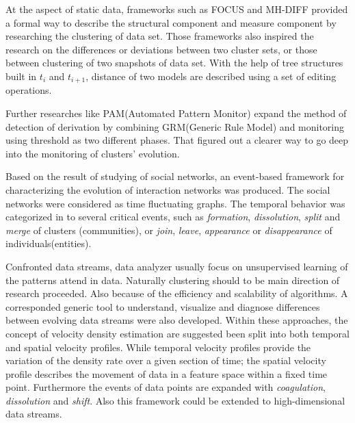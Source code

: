 \documentclass{sig-alternate-05-2015}
\begin{document}
At the aspect of static data, frameworks such as FOCUS\cite{GANTI:datachar} and MH-DIFF\cite{CHAWATHE:changedetection} provided a formal way to describe the structural component and measure component by researching the clustering of data set. Those frameworks also inspired the research on the differences or deviations between two cluster sets, or those between clustering of two snapshots of data set. With the help of tree structures built in $t_i$ and $t_{i+1}$, distance of two models are described using a set of editing operations.

Further researches like PAM(Automated Pattern Monitor)\cite{BARON:webusagepattern} expand the method of detection of derivation by combining GRM(Generic Rule Model) and monitoring using threshold as two different phases. That figured out a clearer way to go deep into the monitoring of clusters' evolution.

Based on the result of studying of social networks, an event-based framework\cite{FALKOWSKI:socialnet}\cite{ASUR:event} for characterizing the evolution of interaction networks was produced. The social networks were considered as time fluctuating graphs. The temporal behavior was categorized in to several critical events, such as \emph{formation}, \emph{dissolution}, \emph{split} and \emph{merge} of clusters (communities), or \emph{join}, \emph{leave}, \emph{appearance} or \emph{disappearance} of individuals(entities).

Confronted data streams, data analyzer usually focus on unsupervised learning of the patterns attend in data. Naturally clustering should to be main direction of research proceeded\cite{AGGARWAL:diagnosis}\cite{AGGARWAL:framework}\cite{CHEN:change}\cite{OCALLAGHAN:highquality}\cite{ELNEKAVE}\cite{KALNIS:movingclusters}\cite{LI:entropy}. Also because of the efficiency and scalability of algorithms. A corresponded generic tool to understand, visualize and diagnose differences between evolving data streams were also developed. Within these approaches, the concept of velocity density estimation are suggested been split into both temporal and spatial velocity profiles. While temporal velocity profiles provide the variation of the density rate over a given section of time; the spatial velocity profile describes the movement of data in a feature space within a fixed time point. Furthermore the events of data points are expanded with \emph{coagulation}, \emph{dissolution} and \emph{shift}. Also this framework could be extended to high-dimensional data streams.
\end{document}
